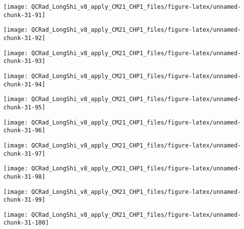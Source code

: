 \documentclass[
  10pt,
  a4paper,oneside]{article}
\begin{document}
\begin{center}\texttt{[image: QCRad\_LongShi\_v8\_apply\_CM21\_CHP1\_files/figure-latex/unnamed-chunk-31-91]} \end{center}

\begin{center}\texttt{[image: QCRad\_LongShi\_v8\_apply\_CM21\_CHP1\_files/figure-latex/unnamed-chunk-31-92]} \end{center}

\begin{center}\texttt{[image: QCRad\_LongShi\_v8\_apply\_CM21\_CHP1\_files/figure-latex/unnamed-chunk-31-93]} \end{center}

\begin{center}\texttt{[image: QCRad\_LongShi\_v8\_apply\_CM21\_CHP1\_files/figure-latex/unnamed-chunk-31-94]} \end{center}

\begin{center}\texttt{[image: QCRad\_LongShi\_v8\_apply\_CM21\_CHP1\_files/figure-latex/unnamed-chunk-31-95]} \end{center}

\begin{center}\texttt{[image: QCRad\_LongShi\_v8\_apply\_CM21\_CHP1\_files/figure-latex/unnamed-chunk-31-96]} \end{center}

\begin{center}\texttt{[image: QCRad\_LongShi\_v8\_apply\_CM21\_CHP1\_files/figure-latex/unnamed-chunk-31-97]} \end{center}

\begin{center}\texttt{[image: QCRad\_LongShi\_v8\_apply\_CM21\_CHP1\_files/figure-latex/unnamed-chunk-31-98]} \end{center}

\begin{center}\texttt{[image: QCRad\_LongShi\_v8\_apply\_CM21\_CHP1\_files/figure-latex/unnamed-chunk-31-99]} \end{center}

\begin{center}\texttt{[image: QCRad\_LongShi\_v8\_apply\_CM21\_CHP1\_files/figure-latex/unnamed-chunk-31-100]} \end{center}
\end{document}

